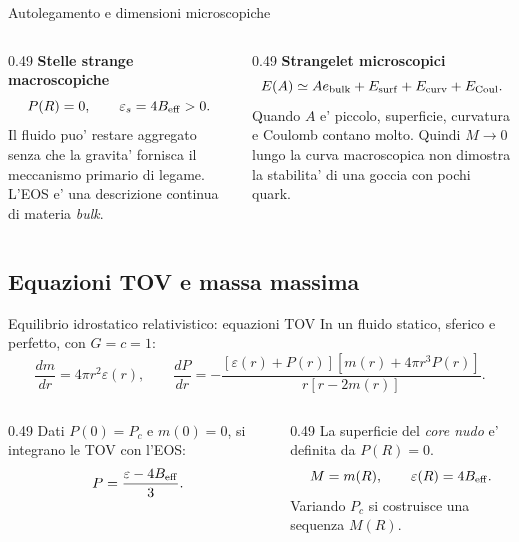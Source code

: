 \begin{frame}{Autolegamento e dimensioni microscopiche}
\small
\begin{columns}[T,onlytextwidth]
\begin{column}{0.49\textwidth}
\textbf{Stelle strange macroscopiche}
\[
P(R)=0,\qquad \varepsilon_s=4B_{\rm eff}>0.
\]
Il fluido puo' restare aggregato senza che la gravita' fornisca il meccanismo primario di legame.
\medskip
L'EOS e' una descrizione continua di materia \emph{bulk}.
\end{column}
\begin{column}{0.49\textwidth}
\textbf{Strangelet microscopici}
\[
E(A)\simeq A e_{\rm bulk}+E_{\rm surf}
+E_{\rm curv}+E_{\rm Coul}.
\]
Quando $A$ e' piccolo, superficie, curvatura e Coulomb contano molto.
\medskip
Quindi $M\to0$ lungo la curva macroscopica non dimostra la stabilita' di una goccia con pochi quark.
\end{column}
\end{columns}
\end{frame}

\subsection{Equazioni TOV e massa massima}

\begin{frame}{Equilibrio idrostatico relativistico: equazioni TOV}
\small
In un fluido statico, sferico e perfetto, con $G=c=1$:
\[
\frac{dm}{dr}=4\pi r^2\varepsilon(r),
\qquad
\frac{dP}{dr}=-\frac{[\varepsilon(r)+P(r)]
[m(r)+4\pi r^3P(r)]}{r[r-2m(r)]}.
\]
\begin{columns}[T,onlytextwidth]
\begin{column}{0.49\textwidth}
Dati $P(0)=P_c$ e $m(0)=0$, si integrano le TOV con l'EOS:
\[
P=\frac{\varepsilon-4B_{\rm eff}}{3}.
\]
\end{column}
\begin{column}{0.49\textwidth}
La superficie del \emph{core nudo} e' definita da $P(R)=0$.
\[
M=m(R),\qquad \varepsilon(R)=4B_{\rm eff}.
\]
Variando $P_c$ si costruisce una sequenza $M(R)$.
\end{column}
\end{columns}
\end{frame}

